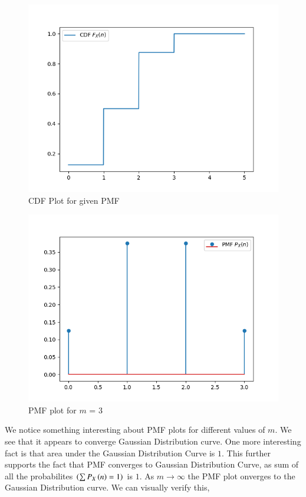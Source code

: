 \documentclass[journal]{IEEEtran}
\begin{document}
\begin{figure}[h!]
  \centering
  \includegraphics[width=0.7\columnwidth]{figs/cdf.png}
  \caption{CDF Plot for given PMF}
  \label{label}
\end{figure}

\begin{figure}[h!]
  \centering
  \includegraphics[width=0.7\columnwidth]{figs/pmf1.png}
  \caption{PMF plot for $m$ = 3}
  \label{label}
\end{figure}

We notice something interesting about PMF plots for different values of $m$. We see that it appears to converge Gaussian Distribution curve. One more interesting fact is that area under the Gaussian Distribution Curve is $1$. This further supports the fact that PMF converges to Gaussian Distribution Curve, as sum of all the probabilites $\left(\sum P_X\left(n\right) = 1\right)$ is $1$.  As $m \rightarrow \infty$ the PMF plot onverges to the Gaussian Distribution curve. We can visually verify this, \newline
\end{document}
